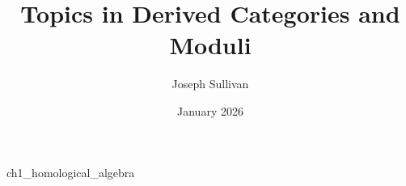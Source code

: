 \documentclass{book}
\title{Topics in Derived Categories and Moduli}
\author{Joseph Sullivan}
\date{January 2026}
\begin{document}
\maketitle
\tableofcontents

{ch1_homological_algebra}
\end{document}
